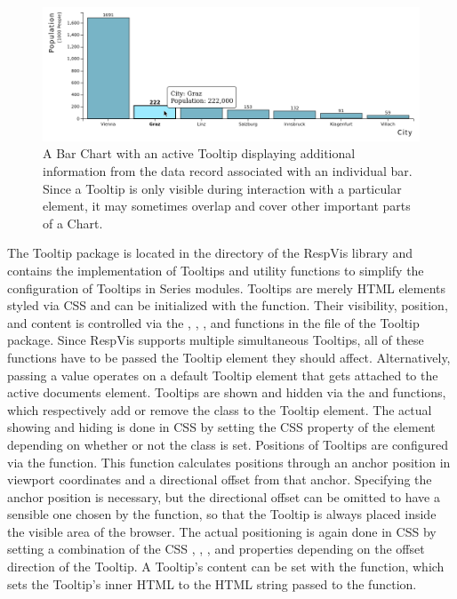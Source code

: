 \begin{figure}[tp]
\centering
\includegraphics[keepaspectratio,width=\linewidth,height=\fullh]
{images/tooltip.png}
\caption[Tooltip Example]{%
A Bar Chart with an active Tooltip displaying
additional information from the data record associated with an
individual bar. Since a Tooltip is only visible during
interaction with a particular element, it may sometimes overlap
and cover other important parts of a Chart.
}
\label{fig:Tooltip}
\end{figure}


The Tooltip package is located in the
 directory of the RespVis library and contains
the implementation of Tooltips and utility functions to simplify the
configuration of Tooltips in Series modules. Tooltips are merely HTML
 elements styled via CSS and can be initialized with the
 function. Their visibility, position, and content is
controlled via the , ,
, and  functions in the
 file of the Tooltip package. Since RespVis
supports multiple simultaneous Tooltips, all of these functions have
to be passed the Tooltip element they should affect. Alternatively,
passing a  value operates on a default Tooltip element that
gets attached to the active documents  element.
Tooltips are shown and hidden via the  and
 functions, which respectively add or remove the
 class to the Tooltip element. The actual showing and
hiding is done in CSS by setting the CSS  property of
the element depending on whether or not the  class is set.
Positions of Tooltips are configured via the 
function. This function calculates positions through an anchor
position in viewport coordinates and a directional offset from that
anchor. Specifying the anchor position is necessary, but the
directional offset can be omitted to have a sensible one chosen by the
 function, so that the Tooltip is always placed
inside the visible area of the browser. The actual positioning is
again done in CSS by setting a combination of the CSS ,
, , and  properties
depending on the offset direction of the Tooltip. A Tooltip's content
can be set with the  function, which sets the
Tooltip's inner HTML to the HTML string passed to the function.

